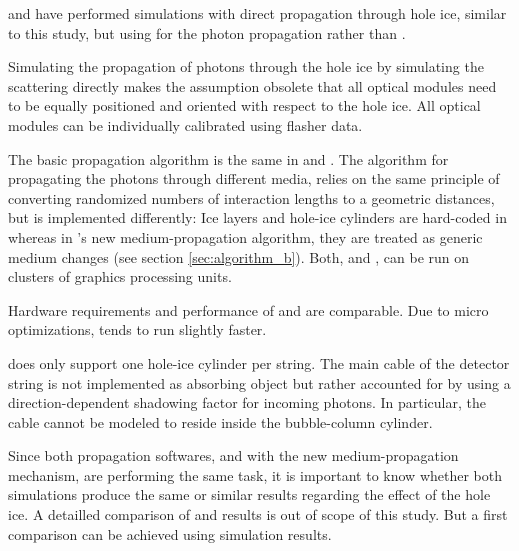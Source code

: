 \chirkin and \rongen have performed simulations with direct propagation through hole ice, similar to this study, but using \ppc for the photon propagation rather than \clsim. \cite{martinspicehddard}\cite{martindardupdate}\cite{pocam}\cite{icrc17pocam}\cite{ppcpaper}


Simulating the propagation of photons through the hole ice by simulating the scattering directly makes the assumption obsolete that all optical modules need to be equally positioned and oriented with respect to the hole ice. All optical modules can be individually calibrated using flasher data. \cite{martinspicehddard}

The basic propagation algorithm is the same in \ppc and \clsim. The algorithm for propagating the photons through different media, relies on the same principle of converting randomized numbers of interaction lengths to a geometric distances, but is implemented differently: Ice layers and hole-ice cylinders are hard-coded in \ppc whereas in \clsim's new medium-propagation algorithm, they are treated as generic medium changes (see section \ref{sec:algorithm_b}). Both, \ppc and \clsim, can be run on clusters of graphics processing units.

Hardware requirements and performance of \ppc and \clsim are comparable. Due to micro optimizations, \ppc tends to run slightly faster. \mref{}

\ppc does only support one hole-ice cylinder per string. The main cable of the detector string is not implemented as absorbing object but rather accounted for by using a direction-dependent shadowing factor for incoming photons. \cite{ppcsource}\cite{ppcforhumans}
In particular, the cable cannot be modeled to reside inside the bubble-column cylinder. \cite{martinspicehddard}

Since both propagation softwares, \ppc and \clsim with the new medium-propagation mechanism, are performing the same task, it is important to know whether both simulations produce the same or similar results regarding the effect of the hole ice. A detailled comparison of \ppc and \clsim results is out of scope of this study. But a first comparison can be achieved using  simulation results.\followup

